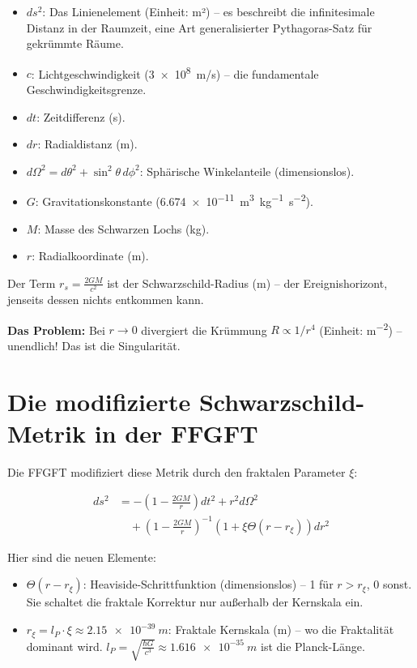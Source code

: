 	\begin{itemize}[leftmargin=*]
		\item \(ds^2\): Das Linienelement (Einheit: m²) – es beschreibt die infinitesimale Distanz in der Raumzeit, eine Art generalisierter Pythagoras-Satz für gekrümmte Räume.
		\item \(c\): Lichtgeschwindigkeit (\SI{3e8}{m/s}) – die fundamentale Geschwindigkeitsgrenze.
		\item \(dt\): Zeitdifferenz (s).
		\item \(dr\): Radialdistanz (m).
		\item \(d\Omega^2 = d\theta^2 + \sin^2\theta \, d\phi^2\): Sphärische Winkelanteile (dimensionslos).
		\item \(G\): Gravitationskonstante (\SI{6.674e-11}{m^3.kg^{-1}.s^{-2}}).
		\item \(M\): Masse des Schwarzen Lochs (kg).
		\item \(r\): Radialkoordinate (m).
	\end{itemize}
	
	Der Term \(r_s = \frac{2GM}{c^2}\) ist der Schwarzschild-Radius (m) – der Ereignishorizont, jenseits dessen nichts entkommen kann.
	
	\textbf{Das Problem:} Bei \(r \to 0\) divergiert die Krümmung \(R \propto 1/r^4\) (Einheit: \si{m^{-2}}) – unendlich! Das ist die Singularität.
	
	\section{Die modifizierte Schwarzschild-Metrik in der FFGFT}
	
	Die FFGFT modifiziert diese Metrik durch den fraktalen Parameter \(\xi\):
	
\begin{equation}
	\begin{aligned}
		ds^2 &= -\left(1 - \frac{2GM}{r}\right) dt^2 + r^2 d\Omega^2 \\
		&\quad + \left(1 - \frac{2GM}{r}\right)^{-1} \left(1 + \xi \Theta(r - r_\xi)\right) dr^2
	\end{aligned}
\end{equation}
	
	Hier sind die neuen Elemente:
	
	\begin{itemize}[leftmargin=*]
		\item \(\Theta(r - r_\xi)\): Heaviside-Schrittfunktion (dimensionslos) – 1 für \(r > r_\xi\), 0 sonst. Sie schaltet die fraktale Korrektur nur außerhalb der Kernskala ein.
		\item \(r_\xi = l_P \cdot \xi \approx \SI{2.15e-39}{m}\): Fraktale Kernskala (m) – wo die Fraktalität dominant wird. \(l_P = \sqrt{\frac{\hbar G}{c^3}} \approx \SI{1.616e-35}{m}\) ist die Planck-Länge.
	\end{itemize}
	
